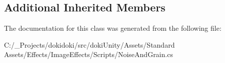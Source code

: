 \subsection*{Additional Inherited Members}


The documentation for this class was generated from the following file\+:\begin{DoxyCompactItemize}
\item 
C\+:/\+\_\+\+Projects/dokidoki/src/doki\+Unity/\+Assets/\+Standard Assets/\+Effects/\+Image\+Effects/\+Scripts/Noise\+And\+Grain.\+cs\end{DoxyCompactItemize}
